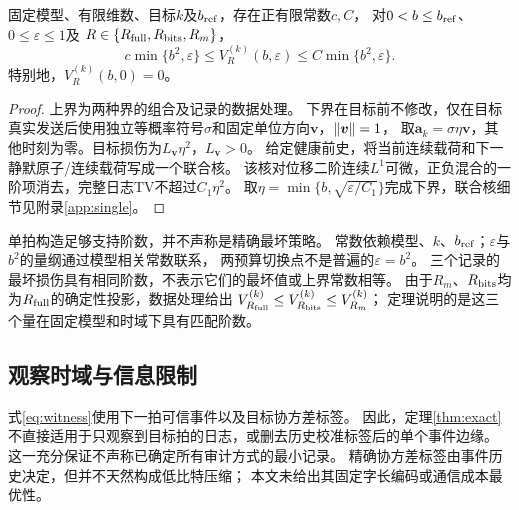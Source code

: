 \begin{theorem}[精确反馈的有限时域损伤阶数]
\label{thm:exact}
固定模型、有限维数、目标$k$及$b_{\rm ref}$，存在正有限常数$c,C$，
对$0<b\le b_{\rm ref}$、$0\le\varepsilon\le1$及
$R\in\{R_{\rm full},R_{\rm bits},R_m\}$，
\begin{equation}
c\min\{b^2,\varepsilon\}\le V_R^{(k)}(b,\varepsilon)
\le C\min\{b^2,\varepsilon\}.
\label{eq:exact-bound}
\end{equation}
特别地，$V_R^{(k)}(b,0)=0$。
\end{theorem}
\begin{proof}
上界为两种界的组合及记录的数据处理。
下界在目标前不修改，仅在目标真实发送后使用独立等概率符号$\sigma$和固定单位方向${\bm{v}}$，$\left\|\bm{v}\right\|=1$，
取${\bm{a}}_k=\sigma\eta {\bm{v}}$，其他时刻为零。目标损伤为$L_{\bm{v}}\eta^2$，$L_{\bm{v}}>0$。
给定健康前史，将当前连续载荷和下一静默原子/连续载荷写成一个联合核。
该核对位移二阶连续$L^1$可微，正负混合的一阶项消去，完整日志TV不超过$C_1\eta^2$。
取$\eta=\min\{b,\sqrt{\varepsilon/C_1}\}$完成下界，联合核细节见附录\ref{app:single}。
\end{proof}
单拍构造足够支持阶数，并不声称是精确最坏策略。
常数依赖模型、$k$、$b_{\rm ref}$；$\varepsilon$与$b^2$的量纲通过模型相关常数联系，
两预算切换点不是普遍的$\varepsilon=b^2$。
三个记录的最坏损伤具有相同阶数，不表示它们的最坏值或上界常数相等。
由于$R_m$、$R_{\rm bits}$均为$R_{\rm full}$的确定性投影，数据处理给出
$V_{R_{\rm full}}^{(k)}\le V_{R_{\rm bits}}^{(k)}\le V_{R_m}^{(k)}$；
定理说明的是这三个量在固定模型和时域下具有匹配阶数。

\subsection{观察时域与信息限制}
式\eqref{eq:witness}使用下一拍可信事件以及目标协方差标签。
因此，定理\ref{thm:exact}不直接适用于只观察到目标拍的日志，或删去历史校准标签后的单个事件边缘。
这一充分保证不声称已确定所有审计方式的最小记录。
精确协方差标签由事件历史决定，但并不天然构成低比特压缩；
本文未给出其固定字长编码或通信成本最优性。
